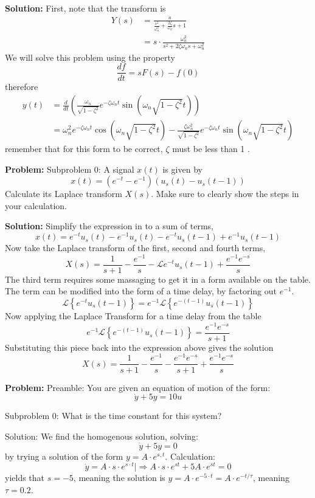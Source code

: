 \documentclass[10pt]{article}
\begin{document}
\textbf{Solution:}
First, note that the transform is
\[
\begin{aligned}
Y(s) &=\frac{s}{\frac{s^{2}}{\omega_{n}^{2}}+\frac{2 \zeta}{\omega_{n}} s+1} \\
&=s \cdot \frac{\omega_{n}^{2}}{s^{2}+2 \zeta \omega_{n} s+\omega_{n}^{2}}
\end{aligned}
\]
We will solve this problem using the property
\[
\frac{d f}{d t}=s F(s)-f(0)
\]
therefore
\[
\begin{aligned}
y(t) &=\frac{d}{d t}\left(\frac{\omega_{n}}{\sqrt{1-\zeta^{2}}} e^{-\zeta \omega_{n} t} \sin \left(\omega_{n} \sqrt{1-\zeta^{2}} t\right)\right) \\
&=\boxed{\omega_{n}^{2} e^{-\zeta \omega_{n} t} \cos \left(\omega_{n} \sqrt{1-\zeta^{2}} t\right)-\frac{\zeta \omega_{n}^{2}}{\sqrt{1-\zeta^{2}}} e^{-\zeta \omega_{n} t} \sin \left(\omega_{n} \sqrt{1-\zeta^{2}} t\right)}
\end{aligned}
\]
remember that for this form to be correct, \(\zeta\) must be less than 1 .


\textbf{Problem:}
Subproblem 0: A signal \(x(t)\) is given by
\[
x(t)=\left(e^{-t}-e^{-1}\right)\left(u_{s}(t)-u_{s}(t-1)\right)
\]
Calculate its Laplace transform \(X(s)\). Make sure to clearly show the steps in your calculation. 


\textbf{Solution:}
Simplify the expression in to a sum of terms,
\[
x(t)=e^{-t} u_{s}(t)-e^{-1} u_{s}(t)-e^{-t} u_{s}(t-1)+e^{-1} u_{s}(t-1)
\]
Now take the Laplace transform of the first, second and fourth terms,
\[
X(s)=\frac{1}{s+1}-\frac{e^{-1}}{s}-\mathcal{L} e^{-t} u_{s}(t-1)+\frac{e^{-1} e^{-s}}{s}
\]
The third term requires some massaging to get it in a form available on the table. The term can be modified into the form of a time delay, by factoring out \(e^{-1}\).
\[
\mathcal{L}\left\{e^{-t} u_{s}(t-1)\right\}=e^{-1} \mathcal{L}\left\{e^{-(t-1)} u_{s}(t-1)\right\}
\]
Now applying the Laplace Transform for a time delay from the table
\[
e^{-1} \mathcal{L}\left\{e^{-(t-1)} u_{s}(t-1)\right\}=\frac{e^{-1} e^{-s}}{s+1}
\]
Substituting this piece back into the expression above gives the solution
\[
X(s)=\boxed{\frac{1}{s+1}-\frac{e^{-1}}{s}-\frac{e^{-1} e^{-s}}{s+1}+\frac{e^{-1} e^{-s}}{s}}
\]


\textbf{Problem:}
Preamble: You are given an equation of motion of the form:
\[
\dot{y}+5 y=10 u
\]

Subproblem 0: What is the time constant for this system?


Solution: We find the homogenous solution, solving:
\[
\dot{y}+5 y=0
\]
by trying a solution of the form $y=A \cdot e^{s, t}$.
Calculation:
\[
\dot{y}=A \cdot s \cdot e^{s \cdot t} \mid \Rightarrow A \cdot s \cdot e^{s t}+5 A \cdot e^{s t}=0
\]
yields that $s=-5$, meaning the solution is $y=A \cdot e^{-5 \cdot t}=A \cdot e^{-t / \tau}$, meaning $\tau = \boxed{0.2}$.
\end{document}
